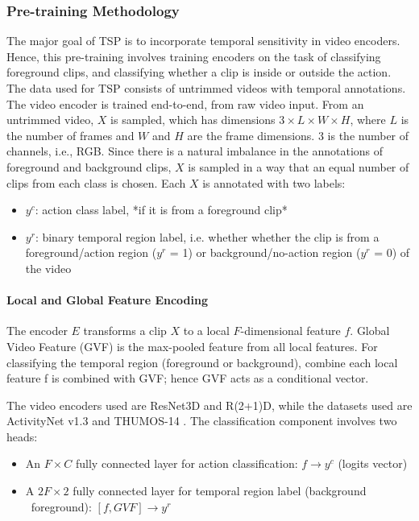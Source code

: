 \subsubsection{Pre-training Methodology}
The major goal of TSP is to incorporate temporal sensitivity in video encoders. Hence, this 
pre-training involves training encoders on the task of classifying foreground clips, and 
classifying whether a clip is inside or outside the action. The data used for TSP consists 
of untrimmed videos with temporal annotations. The video encoder is trained end-to-end, from 
raw video input. From an untrimmed video, $X$ is sampled, which has dimensions $3 \times L 
\times W \times H$, where $L$ is the number of frames and $W$ and $H$ are the frame 
dimensions. 3 is the number of channels, i.e., RGB. Since there is a natural imbalance in 
the annotations of foreground and background clips, $X$ is sampled in a way that an equal 
number of clips from each class is chosen. Each $X$ is annotated with two labels:
\begin{itemize}
\item $y^c$: action class label, *if it is from a foreground clip*
\item $y^r$: binary temporal region label, i.e. whether whether the clip is from a 
foreground/action region ($y^r$ = 1) or background/no-action region ($y^r$ = 0) of the video
\end{itemize}

\paragraph{Local and Global Feature Encoding}
The encoder $E$ transforms a clip $X$ to a local $F$-dimensional feature $f$. Global Video 
Feature (GVF) is the max-pooled feature from all local features. For classifying the 
temporal region (foreground or background), combine each local feature f is combined with 
GVF; hence GVF acts as a conditional vector.

\par The video encoders used are ResNet3D and R(2+1)D, while the datasets used are 
ActivityNet v1.3 and THUMOS-14 \cite{thumos-14}. The classification component involves two  
heads:
\begin{itemize}
\item An $F \times C$ fully connected layer for action classification: $f \rightarrow y^c$  (logits vector)
\item A $2F \times 2$ fully connected layer for temporal region label (background \ foreground): $[f, GVF] \rightarrow y^r$
\end{itemize}

